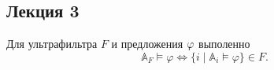 

\subsection{Лекция 3}

\begin{stat}[Следствие]
    Для ультрафильтра $F$ и предложения $\varphi$ выполенно
    $$\mathbb{A}_F \models \varphi \Longleftrightarrow \{i \mid \mathbb{A}_i \models \varphi\} \in F.$$
\end{stat} 

